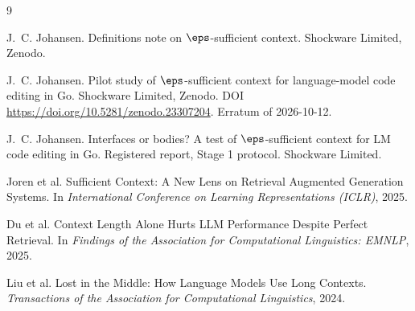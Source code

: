 \begin{thebibliography}{9}

J.~C. Johansen.
Definitions note on $\eps$-sufficient context.
Shockware Limited, Zenodo.

J.~C. Johansen.
Pilot study of $\eps$-sufficient context for language-model code editing in Go.
Shockware Limited, Zenodo.
DOI \url{https://doi.org/10.5281/zenodo.23307204}.
Erratum of 2026-10-12.

J.~C. Johansen.
Interfaces or bodies? A test of $\eps$-sufficient context for LM code editing in Go.
Registered report, Stage 1 protocol. Shockware Limited.

Joren et al.
Sufficient Context: A New Lens on Retrieval Augmented Generation Systems.
In \emph{International Conference on Learning Representations (ICLR)}, 2025.

Du et al.
Context Length Alone Hurts LLM Performance Despite Perfect Retrieval.
In \emph{Findings of the Association for Computational Linguistics: EMNLP}, 2025.

Liu et al.
Lost in the Middle: How Language Models Use Long Contexts.
\emph{Transactions of the Association for Computational Linguistics}, 2024.

\end{thebibliography}
